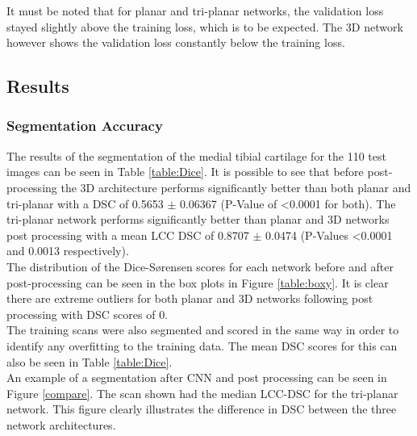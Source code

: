 \documentclass[11pt,a4paper]{memoir}
\numberwithin{figure}{section}
\numberwithin{table}{section}
\numberwithin{equation}{section}
\begin{document}
It must be noted that for planar and tri-planar networks, the validation loss stayed slightly above the training loss, which is to be expected. The 3D network however shows the validation loss constantly below the training loss.

\subsection{Results}
\subsubsection{Segmentation Accuracy}
The results of the segmentation of the medial tibial cartilage for the 110 test images can be seen in Table \ref{table:Dice}. It is possible to see that before post-processing the 3D architecture performs significantly better than both planar and tri-planar with a DSC of 0.5653 $\pm$ 0.06367 (P-Value of \textless 0.0001 for both). The tri-planar network performs significantly better than planar and 3D networks post processing with a mean LCC DSC of 0.8707 $\pm$ 0.0474 (P-Values \textless 0.0001 and 0.0013 respectively).\\ 

The distribution of the Dice-Sørensen scores for each network before and after post-processing can  be seen in the box plots in Figure \ref{table:boxy}. It is clear there are extreme outliers for both planar and 3D networks following post processing with DSC scores of 0.\\

The training scans were also segmented and scored in the same way in order to identify any overfitting to the training data. The mean DSC scores for this can also be seen in Table \ref{table:Dice}. \\

An example of a segmentation after CNN and post processing can be seen in Figure \ref{compare}. The scan shown had the median LCC-DSC for the tri-planar network. This figure clearly illustrates the difference in DSC between the three network architectures. \\
\end{document}
